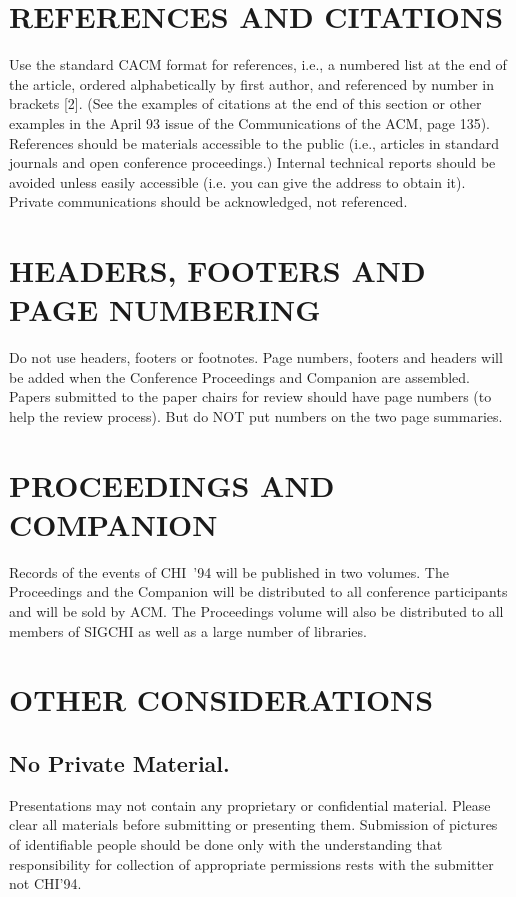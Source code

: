 \section{REFERENCES AND CITATIONS}
Use the standard CACM format for references, i.e., a numbered list at 
the end of the article, ordered alphabetically by first author, and 
referenced by number in brackets [2]. (See the examples of citations 
at the end of this section or other examples in the April 93 issue of 
the Communications of the ACM, page 135). References should be 
materials accessible to the public (i.e., articles in standard 
journals and open conference proceedings.)  Internal technical reports 
should be avoided unless easily accessible (i.e. you can give the 
address to obtain it).  Private communications should be acknowledged, 
not referenced.

\section{HEADERS, FOOTERS AND PAGE NUMBERING}
Do not use headers, footers or footnotes. Page numbers, footers and 
headers will be added when the Conference Proceedings and Companion 
are assembled. Papers submitted to the paper chairs for review should 
have page numbers (to help the review process).  But do NOT put 
numbers on the two page summaries.

\section{PROCEEDINGS AND COMPANION}
Records of the events of CHI~'94 will be published in two volumes.  
The Proceedings and the Companion will be  distributed to all 
conference participants and will be sold by ACM. The Proceedings 
volume will also be distributed to all members of SIGCHI as well as a 
large number of libraries. 

\section{OTHER CONSIDERATIONS}
\subsection{No Private Material.}
Presentations may not contain any proprietary or confidential 
material. Please clear all materials before submitting or presenting 
them.  Submission of pictures of identifiable people should be done 
only with the understanding that responsibility for collection of 
appropriate permissions rests with the submitter not CHI'94.

